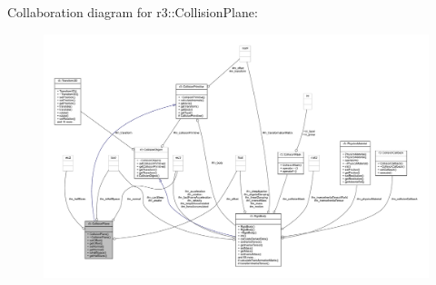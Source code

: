 Collaboration diagram for r3\+:\+:Collision\+Plane\+:\nopagebreak
\begin{figure}[H]
\begin{center}
\leavevmode
\includegraphics[width=350pt]{classr3_1_1_collision_plane__coll__graph}
\end{center}
\end{figure}
